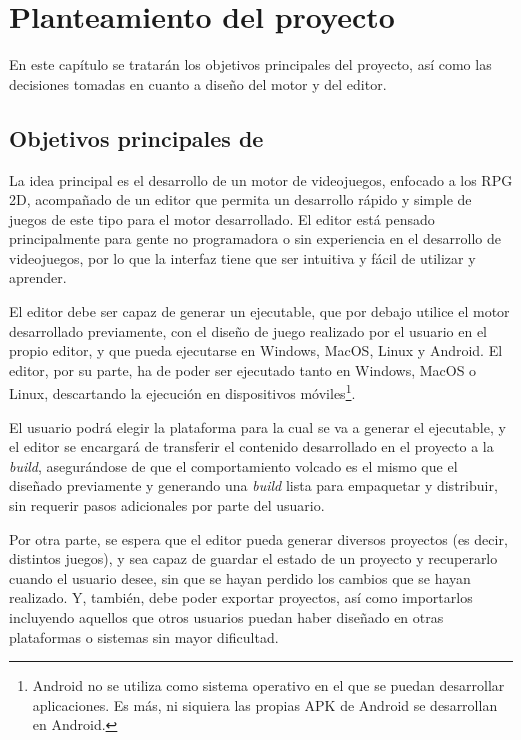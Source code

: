 \chapter{Planteamiento del proyecto}
\label{cap:planteamiento}

\begin{resumen}
En este capítulo se tratarán los objetivos principales del proyecto, así como las decisiones tomadas en cuanto a diseño del motor y del editor.
\end{resumen}

\section{Objetivos principales de \baker}
La idea principal es el desarrollo de un motor de videojuegos, enfocado a los RPG 2D, acompañado de un editor que permita un desarrollo rápido y simple de juegos de este tipo para el motor desarrollado. El editor está pensado principalmente para gente no programadora o sin experiencia en el desarrollo de videojuegos, por lo que la interfaz tiene que ser intuitiva y fácil de utilizar y aprender.

\smallskip

El editor debe ser capaz de generar un ejecutable, que por debajo utilice el motor desarrollado previamente, con el diseño de juego realizado por el usuario en el propio editor, y que pueda ejecutarse en Windows, MacOS, Linux y Android. El editor, por su parte, ha de poder ser ejecutado tanto en Windows, MacOS o Linux, descartando la ejecución en dispositivos móviles\footnote{Android no se utiliza como sistema operativo en el que se puedan desarrollar aplicaciones. Es más, ni siquiera las propias APK de Android se desarrollan en Android.}.

\smallskip

El usuario podrá elegir la plataforma para la cual se va a generar el ejecutable, y el editor se encargará de transferir el contenido desarrollado en el proyecto a la \textit{build}, asegurándose de que el comportamiento volcado es el mismo que el diseñado previamente y generando una \textit{build} lista para empaquetar y distribuir, sin requerir pasos adicionales por parte del usuario.

\medskip

Por otra parte, se espera que el editor pueda generar diversos proyectos (es decir, distintos juegos), y sea capaz de guardar el estado de un proyecto y recuperarlo cuando el usuario desee, sin que se hayan perdido los cambios que se hayan realizado. Y, también, debe poder exportar proyectos, así como importarlos incluyendo aquellos que otros usuarios puedan haber diseñado en otras plataformas o sistemas sin mayor dificultad.

